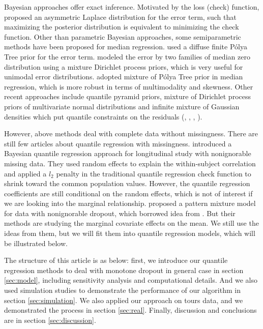 \documentclass[12pt]{article}
\newcommand{\polya}{P\'{o}lya}
\begin{document}
Bayesian approaches offer exact inference. Motivated by the loss
(check) function, \citet{yu2001} proposed an asymmetric Laplace
distribution for the error term, such that maximizing the posterior
distribution is equivalent to minimizing the check function. Other
than parametric Bayesian approaches, some semiparametric methods have
been proposed for median regression. \citet{walker1999} used a diffuse
finite \polya{} Tree prior for the error term. \citet{kottas2001}
modeled the error by two families of median zero distribution using a
mixture Dirichlet process priors, which is very useful for unimodal
error distributions. \citet{hanson2002} adopted mixture of \polya{}
Tree prior in median regression, which is more robust in terms of
multimodality and skewness. Other recent approaches include quantile
pyramid priors, mixture of Dirichlet process priors of multivariate
normal distributions and infinite mixture of Gaussian densities which
put quantile constraints on the residuals (\citet{hjort2007},
\citet{hjort2009}, \citet{kottas2009}, \citet{reich2010}).

However, above methods deal with complete data without missingness.
There are still few articles about quantile regression with
missingness.  \citet{yuan2010} introduced a Bayesian quantile
regression approach for longitudinal study with nonignorable missing
data. They used random effects to explain the within-subject
correlation and applied a $l_2$ penalty in the traditional quantile
regression check function to shrink toward the common population
values. However, the quantile regression coefficients are still
conditional on the random effects, which is not of interest if we are
looking into the marginal relationship.  \citet{roy2008} proposed a
pattern mixture model for data with nonignorable dropout, which
borrowed idea from \citet{heagerty1999}.  But their methods are
studying the marginal covariate effects on the mean. We still use the
ideas from them, but we will fit them into quantile regression models,
which will be illustrated below.

The structure of this article is as below: first, we introduce our
quantile regression methods to deal with monotone dropout in general
case in section \ref{sec:model}, including sensitivity analysis and
computational details.  And we also used simulation studies to
demonstrate the performance of our algorithm in section
\ref{sec:simulation}. We also applied our approach on tours data, and
we demonstrated the process in section \ref{sec:real}. Finally,
discussion and conclusions are in section \ref{sec:discussion}.
\end{document}
